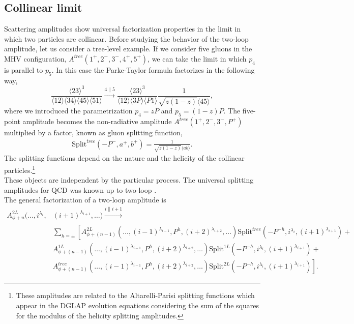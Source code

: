 \subsection{Collinear limit}	\label{coll}
Scattering amplitudes show universal factorization properties in the limit in which two particles are collinear. Before studying the behavior of the two-loop amplitude, let us consider a tree-level example. If we consider five gluons in the MHV configuration, $A^{tree}(1^+,2^-,3^-,4^+,5^+)$, we can take the limit in which $p_4$ is parallel to $p_5$. In this case the Parke-Taylor formula factorizes in the following way,
$$
	\frac{\langle 23 \rangle^3}{\langle 12 \rangle \langle 34 \rangle \langle 45 \rangle \langle 51 \rangle} \xrightarrow[]{4\parallel 5} \frac{\langle 23 \rangle^3}{\langle 12 \rangle \langle 3 P \rangle \langle P 1 \rangle} \frac{1}{\sqrt{z(1-z)} \langle 45 \rangle},
$$
where we introduced the parametrization $p_4=zP$ and $p_5=(1-z)P$. The five-point amplitude becomes the non-radiative amplitude $A^{tree}(1^+,2^-,3^-,P^+)$ multiplied by a factor, known as gluon splitting function,
\begin{align}
	\text{Split}^{tree}(-P^-,a^+,b^+)=\frac{1}{\sqrt{z(1-z)}\langle ab \rangle}.
\end{align}
The splitting functions depend on the nature and the helicity of the collinear particles.\footnote{These amplitudes are related to the Altarelli-Parisi splitting functions which appear in the DGLAP evolution equations considering the sum of the squares for the modulus of the helicity splitting amplitudes.}\\
These objects are independent by the particular process. The universal splitting amplitudes for QCD was known up to two-loop \cite{Bern_1995, Bern_1999, Badger_2004}.\\
The general factorization of a two-loop amplitude is \cite{Kosower_1999}
\begin{align*}
	A^{2L}_{\phi+n}(\dots, i^{\lambda_i}, &(i+1)^{\lambda_{i+1}},\dots) \xrightarrow[]{i\parallel i+1} \\
	&\sum_{h=\pm} \left[ A^{2L}_{\phi+(n-1)}(\dots, (i-1)^{\lambda_{i-1}},P^h, (i+2)^{\lambda_{i+2}},\dots) \text{Split}^{tree}(-P^{-h},i^{\lambda_i}, (i+1)^{\lambda_{i+1}})+\right.\\
	&\left.A^{1L}_{\phi+(n-1)}(\dots, (i-1)^{\lambda_{i-1}},P^h, (i+2)^{\lambda_{i+2}},\dots) \text{Split}^{1L}(-P^{-h},i^{\lambda_i}, (i+1)^{\lambda_{i+1}})+\right.\\
	&\left.A^{tree}_{\phi+(n-1)}(\dots, (i-1)^{\lambda_{i-1}},P^h, (i+2)^{\lambda_{i+2}},\dots) \text{Split}^{2L}(-P^{-h},i^{\lambda_i}, (i+1)^{\lambda_{i+1}})\right].
\end{align*}
